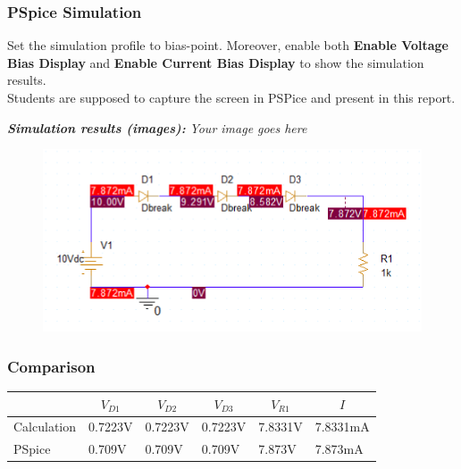 \subsubsection{PSpice Simulation}
Set the simulation profile to bias-point. Moreover, enable both \textbf{Enable Voltage Bias Display} and \textbf{Enable Current Bias Display} to show the simulation results. \\

Students are supposed to capture the screen in PSPice and present in this report.

\textit{\textbf{Simulation results (images):}} \textit{Your image goes here}\\
\begin{figure}[!htp]
    \centering
    \includegraphics[width = 500px]{source/picture/bai_2/sim_ex2.png}
\end{figure}

\vspace{6cm}

\subsubsection{Comparison}

\begin{center}
    \begin{tabular}{l|l|l|l|l|l|}
        \cline{2-6}
                                          & \multicolumn{1}{c|}{$V_{D1}$} & \multicolumn{1}{c|}{$V_{D2}$} & \multicolumn{1}{c|}{$V_{D3}$} & \multicolumn{1}{c|}{$V_{R1}$} & \multicolumn{1}{c|}{$I$} \\ \hline
        \multicolumn{1}{|l|}{Calculation} & 0.7223V                       & 0.7223V                       & 0.7223V                       & 7.8331V                       & 7.8331mA                 \\ \hline
        \multicolumn{1}{|l|}{PSpice}      & 0.709V                        & 0.709V                        & 0.709V                        & 7.873V                        & 7.873mA                  \\ \hline
    \end{tabular}
\end{center}

